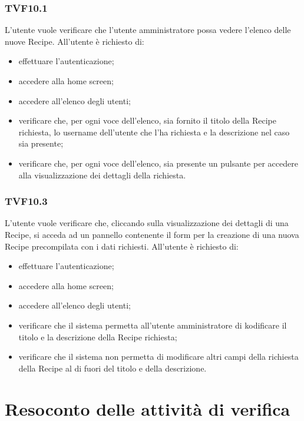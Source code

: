		\subsubsection{TVF10.1}
			L'utente vuole verificare che l'utente amministratore possa vedere l'elenco delle nuove Recipe. All'utente è richiesto di:
			\begin{itemize}
				\item effettuare l'autenticazione;
				\item accedere alla home screen;
				\item accedere all'elenco degli utenti;
				\item verificare che, per ogni voce dell'elenco, sia fornito il titolo della Recipe richiesta, lo username dell'utente che l'ha richiesta e la descrizione nel caso sia presente;
				\item verificare che, per ogni voce dell'elenco, sia presente un pulsante per accedere alla visualizzazione dei dettagli della richiesta.
			\end{itemize}
			
		\subsubsection{TVF10.3}
			L'utente vuole verificare che, cliccando sulla visualizzazione dei dettagli di una Recipe, si acceda ad un pannello contenente il form per la creazione di una nuova Recipe precompilata con i dati richiesti. All'utente è richiesto di:
			\begin{itemize}
				\item effettuare l'autenticazione;
				\item accedere alla home screen;
				\item accedere all'elenco degli utenti;
				\item verificare che il sistema permetta all'utente amministratore di kodificare il titolo e la descrizione della Recipe richiesta;
				\item verificare che il sistema non permetta di modificare altri campi della richiesta della Recipe al di fuori del titolo e della descrizione.
			\end{itemize}
			
\pagebreak


\section{Resoconto delle attività di verifica}
